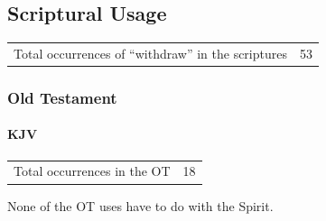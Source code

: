 \subsection{Scriptural Usage} %
	\label{WITHDRAW-SCRIPTURES}
	
	\begin{tabular}{ll}
		Total occurrences of ``withdraw'' in the scriptures & 53 \\
	\end{tabular}

	\subsubsection{Old Testament} %
		\label{WITHDRAW-OT}
	
		\paragraph{KJV}
			\label{WITHDRAW-OT-KJV}
	
			\begin{tabular}{ll}
				Total occurrences in the OT & 18
			\end{tabular}
			
			None of the OT uses have to do with the Spirit.
			
			
		
			
				
